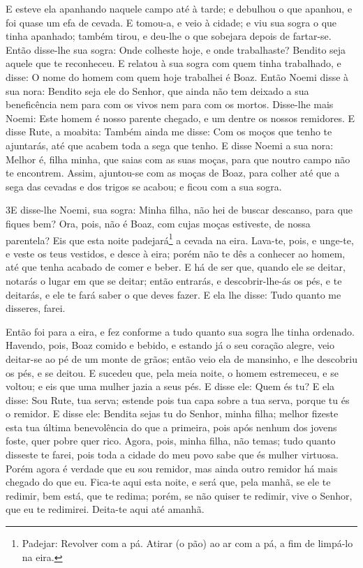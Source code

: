 E esteve ela apanhando naquele campo até à tarde; e debulhou o
que apanhou, e foi quase um efa de cevada. E tomou-a, e veio
à cidade; e viu sua sogra o que tinha apanhado; também tirou, e
deu-lhe o que sobejara depois de fartar-se. Então disse-lhe
sua sogra: Onde colheste hoje, e onde trabalhaste? Bendito seja
aquele que te reconheceu. E relatou à sua sogra com quem tinha
trabalhado, e disse: O nome do homem com quem hoje trabalhei é Boaz.
Então Noemi disse à sua nora: Bendito seja ele do Senhor, que
ainda não tem deixado a sua beneficência nem para com os vivos nem
para com os mortos. Disse-lhe mais Noemi: Este homem é nosso parente
chegado, e um dentre os nossos remidores. E disse Rute, a
moabita: Também ainda me disse: Com os moços que tenho te ajuntarás,
até que acabem toda a sega que tenho. E disse Noemi a sua
nora: Melhor é, filha minha, que saias com as suas moças, para que
noutro campo não te encontrem. Assim, ajuntou-se com as moças
de Boaz, para colher até que a sega das cevadas e dos trigos se
acabou; e ficou com a sua sogra.

\medskip

\lettrine{3} E disse-lhe Noemi, sua sogra: Minha filha, não
hei de buscar descanso, para que fiques bem? Ora, pois, não é
Boaz, com cujas moças estiveste, de nossa parentela? Eis que esta
noite padejará\footnote{Padejar: Revolver com a pá. Atirar (o pão)
ao ar com a pá, a fim de limpá-lo na eira.} a cevada na eira.
Lava-te, pois, e unge-te, e veste os teus vestidos, e desce à
eira; porém não te dês a conhecer ao homem, até que tenha acabado de
comer e beber. E há de ser que, quando ele se deitar, notarás o
lugar em que se deitar; então entrarás, e descobrir-lhe-ás os pés, e
te deitarás, e ele te fará saber o que deves fazer. E ela lhe
disse: Tudo quanto me disseres, farei.

Então foi para a eira, e fez conforme a tudo quanto sua sogra lhe
tinha ordenado. Havendo, pois, Boaz comido e bebido, e estando
já o seu coração alegre, veio deitar-se ao pé de um monte de grãos;
então veio ela de mansinho, e lhe descobriu os pés, e se deitou.
E sucedeu que, pela meia noite, o homem estremeceu, e se voltou;
e eis que uma mulher jazia a seus pés. E disse ele: Quem és tu?
E ela disse: Sou Rute, tua serva; estende pois tua capa sobre a tua
serva, porque tu és o remidor. E disse ele: Bendita sejas tu
do Senhor, minha filha; melhor fizeste esta tua última benevolência
do que a primeira, pois após nenhum dos jovens foste, quer pobre
quer rico. Agora, pois, minha filha, não temas; tudo quanto
disseste te farei, pois toda a cidade do meu povo sabe que és mulher
virtuosa. Porém agora é verdade que eu sou remidor, mas ainda
outro remidor há mais chegado do que eu. Fica-te aqui esta
noite, e será que, pela manhã, se ele te redimir, bem está, que te
redima; porém, se não quiser te redimir, vive o Senhor, que eu te
redimirei. Deita-te aqui até amanhã.

